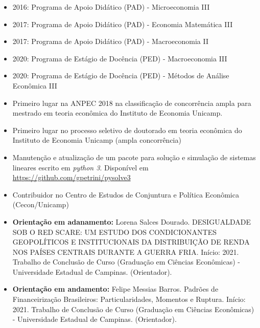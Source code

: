 \documentclass[11pt,a4paper]{article}
\begin{document}
\begin{itemize}
	\item 2016: Programa de Apoio Didático (PAD) - Microeconomia III
	\item 2017: Programa de Apoio Didático (PAD) - Economia Matemática III
	\item 2017: Programa de Apoio Didático (PAD) - Macroeconomia II
	\item 2020: Programa de Estágio de Docência (PED) - Macroeconomia III
	\item 2020: Programa de Estágio de Docência (PED) - Métodos de Análise Econômica III
	\item Primeiro lugar na ANPEC 2018 na classificação de concorrência ampla para mestrado em teoria econômica do Instituto de Economia Unicamp.
	\item Primeiro lugar no processo seletivo de doutorado em teoria econômica do Instituto de Economia Unicamp (ampla concorrência)
  \item Manutenção e atualização de um pacote para solução e simulação de sistemas lineares escrito em \textit{python 3}. Disponível em \url{https://github.com/gpetrini/pysolve3}
	\item Contribuidor no Centro de Estudos de Conjuntura e Política Econômica (Cecon/Unicamp)
  \item \textbf{Orientação em adanamento:} Lorena Salces Dourado. DESIGUALDADE SOB O RED SCARE: UM ESTUDO DOS CONDICIONANTES GEOPOLÍTICOS E INSTITUCIONAIS DA DISTRIBUIÇÃO DE RENDA NOS PAÍSES CENTRAIS DURANTE A GUERRA FRIA. Início: 2021. Trabalho de Conclusão de Curso (Graduação em Ciências Econômicas) - Universidade Estadual de Campinas. (Orientador).
  \item \textbf{Orientação em andamento:} Felipe Messias Barros. Padrões de Financeirização Brasileiros: Particularidades, Momentos e Ruptura. Início: 2021. Trabalho de Conclusão de Curso (Graduação em Ciências Econômicas) - Universidade Estadual de Campinas. (Orientador).
\end{itemize}
\end{document}
